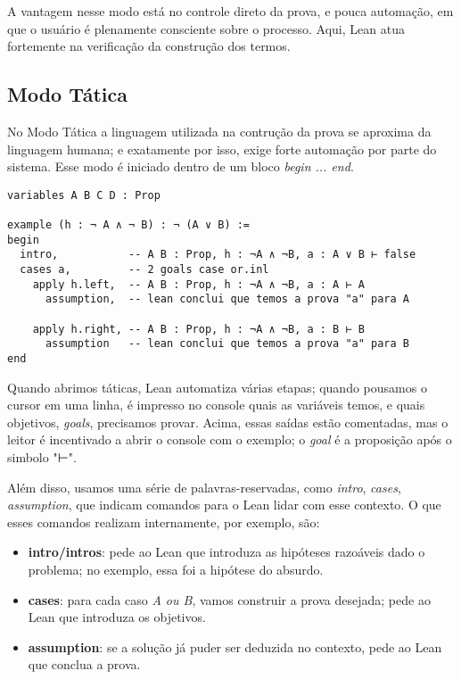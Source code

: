 \noindent A vantagem nesse modo está no controle direto da prova, e pouca automação, em que o usuário é plenamente consciente sobre o processo. Aqui, Lean atua fortemente na verificação da construção dos termos.

\subsection{Modo Tática}
No Modo Tática a linguagem utilizada na contrução da prova se aproxima da linguagem humana; e exatamente por isso, exige forte automação por parte do sistema. Esse modo é iniciado dentro de um bloco \textit{begin ... end}.

\vspace{5mm}
\begin{lstlisting}
variables A B C D : Prop

example (h : ¬ A ∧ ¬ B) : ¬ (A ∨ B) :=
begin
  intro,           -- A B : Prop, h : ¬A ∧ ¬B, a : A ∨ B ⊢ false
  cases a,         -- 2 goals case or.inl
    apply h.left,  -- A B : Prop, h : ¬A ∧ ¬B, a : A ⊢ A
      assumption,  -- lean conclui que temos a prova "a" para A

    apply h.right, -- A B : Prop, h : ¬A ∧ ¬B, a : B ⊢ B
      assumption   -- lean conclui que temos a prova "a" para B
end
\end{lstlisting}
\vspace{5mm}

Quando abrimos táticas, Lean automatiza várias etapas; quando pousamos o cursor em uma linha, é impresso no console quais as variáveis temos, e quais objetivos, \textit{goals}, precisamos provar. Acima, essas saídas estão comentadas, mas o leitor é incentivado a abrir o console com o exemplo; o \textit{goal} é a proposição após o simbolo "⊢".

Além disso, usamos uma série de palavras-reservadas, como \textit{intro}, \textit{cases}, \textit{assumption}, que indicam comandos para o Lean lidar com esse contexto. O que esses comandos realizam internamente, por exemplo, são:

\begin{itemize}
    \item \textbf{intro/intros}: pede ao Lean que introduza as hipóteses razoáveis dado o problema; no exemplo, essa foi a hipótese do absurdo.
    \item \textbf{cases}: para cada caso \textit{A ou B}, vamos construir a prova desejada; pede ao Lean que introduza os objetivos.
    \item \textbf{assumption}: se a solução já puder ser deduzida no contexto, pede ao Lean que conclua a prova.
\end{itemize}

